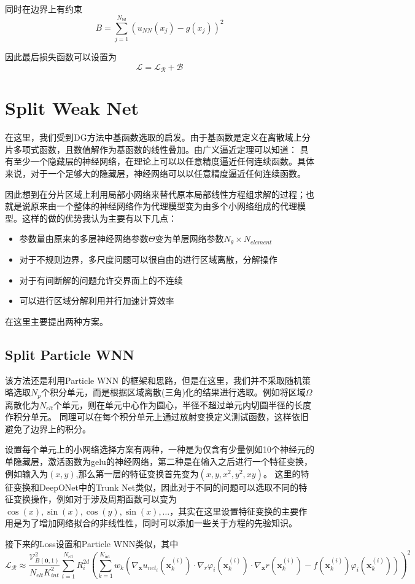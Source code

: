 同时在边界上有约束
$$B= \sum_{j=1}^{N_{bd}}\left(u_{NN}(x_j) - g(x_j)\right)^2$$

因此最后损失函数可以设置为
$$\mathcal{L} = \mathcal{L}_{\mathcal{R}}+\mathcal{B}$$


\section{Split Weak Net}
在这里，我们受到DG方法中基函数选取的启发。由于基函数是定义在离散域上分片多项式函数，且数值解作为基函数的线性叠加。由广义逼近定理可以知道：
具有至少一个隐藏层的神经网络，在理论上可以以任意精度逼近任何连续函数。具体来说，对于一个足够大的隐藏层，神经网络可以以任意精度逼近任何连续函数。

因此想到在分片区域上利用局部小网络来替代原本局部线性方程组求解的过程；也就是说原来由一个整体的神经网络作为代理模型变为由多个小网络组成的代理模型。这样的做的优势我认为主要有以下几点：
\begin{itemize}
    \item 参数量由原来的多层神经网络参数$\Theta$变为单层网络参数$N_{\theta}\times N_{element}$
    \item 对于不规则边界，多尺度问题可以很自由的进行区域离散，分解操作
    \item 对于有间断解的问题允许交界面上的不连续
    \item 可以进行区域分解利用并行加速计算效率
\end{itemize}
在这里主要提出两种方案。
\subsection{Split Particle WNN}
该方法还是利用Particle WNN 的框架和思路，但是在这里，我们并不采取随机策略选取$N_p$个积分单元，而是根据区域离散(三角)化的结果进行选取。例如将区域$\Omega$离散化为$N_{elt}$个单元，则在单元中心作为圆心，半径不超过单元内切圆半径的长度作积分单元。
同理可以在每个积分单元上通过放射变换定义测试函数，这样依旧避免了边界上的积分。

设置每个单元上的小网络选择方案有两种，一种是为仅含有少量例如10个神经元的单隐藏层，激活函数为gelu的神经网络，第二种是在输入之后进行一个特征变换，例如输入为$(x,y)$,那么第一层的特征变换首先变为$(x, y, x^2, y^2,xy)$。
这里的特征变换和DeepONet中的Trunk Net类似，因此对于不同的问题可以选取不同的特征变换操作，例如对于涉及周期函数可以变为$\cos(x), \sin(x), \cos(y), \sin(x),\dots$，其实在这里设置特征变换的主要作用是为了增加网络拟合的非线性性，同时可以添加一些关于方程的先验知识。

接下来的Loss设置和Particle WNN类似，其中
$$\mathcal{L}_{\mathcal{R}} \approx \frac{\mathcal{V}_{B(\mathbf{0}, 1)}^{2}}{N_{elt} K_{i n t}^{2}} \sum_{i=1}^{N_{elt}} R_{i}^{2 d}\left(\sum_{k=1}^{K_{\text {int }}} w_{k}\left(\nabla_{\boldsymbol{x}} u_{net_i}\left(\boldsymbol{x}_{k}^{(i)}\right) \cdot \nabla_{r} \varphi_{i}\left(\boldsymbol{x}_{k}^{(i)}\right) \cdot \nabla_{\boldsymbol{x}} r\left(\boldsymbol{x}_{k}^{(i)}\right)-f\left(\boldsymbol{x}_{k}^{(i)}\right) \varphi_{i}\left(\boldsymbol{x}_{k}^{(i)}\right)\right)\right)^{2}$$

